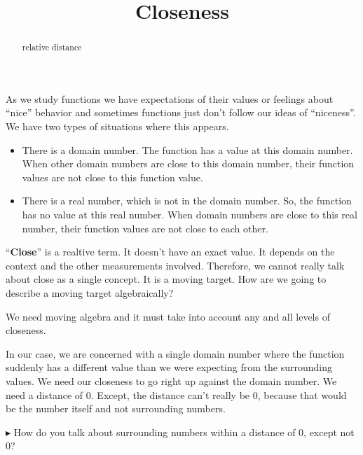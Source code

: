 \documentclass{ximera}
\title{Closeness}
\begin{document}
\begin{abstract}
relative distance
\end{abstract}
\maketitle







As we study functions we have expectations of their values or feelings about ``nice'' behavior and sometimes functions just don't follow our ideas of ``niceness''.  We have two types of situations where this appears.

\begin{itemize}
\item There is a domain number. The function has a value at this domain number. When other domain numbers are close to this domain number, their function values are not close to this function value.
\item There is a real number, which is not in the domain number. So, the function has no value at this real number. When  domain numbers are close to this real number, their function values are not close to each other.
\end{itemize}



``\textbf{\textcolor{purple!85!blue}{Close}}'' is a realtive term.  It doesn't have an exact value.  It depends on the context and the other measurements involved.  Therefore, we cannot really talk about close as a single concept.  It is a moving target.  How are we going to describe a moving target algebraically?

We need moving algebra and it must take into account any and all levels of closeness.


In our case, we are concerned with a single domain number where the function suddenly has a different value than we were expecting from the surrounding values.  We need our closeness to go right up against the domain number. We need a distance of $0$.  Except, the distance can't really be $0$, because that would be the number itself and not surrounding numbers.

\textbf{\textcolor{red!90!darkgray}{$\blacktriangleright$}}  How do you talk about surrounding numbers within a distance of $0$, except not $0$?
\end{document}
